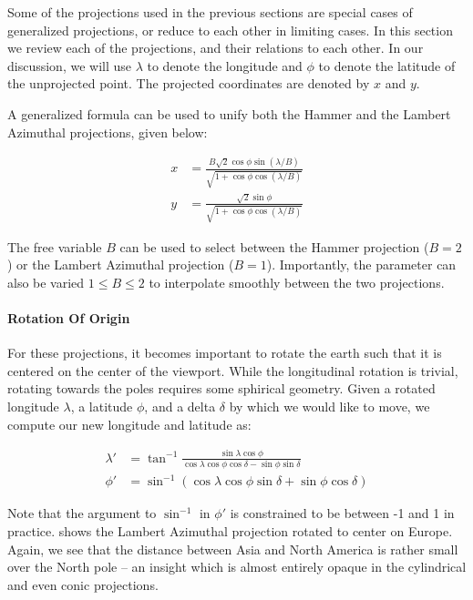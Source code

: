 Some of the projections used in the previous sections are special cases of
  generalized projections, or reduce to each other in limiting cases.
In this section we review each of the projections, and their relations to
  each other.
In our discussion, we will use $\lambda$ to denote the longitude and $\phi$
  to denote the latitude of the unprojected point.
The projected coordinates are denoted by $x$ and $y$.

A generalized formula can be used to unify both the Hammer and the Lambert
  Azimuthal projections, given below:

\def\nu{ \sqrt{1 + \cos \phi \cos (\lambda / B)} }
\begin{align}
x &= \frac{ B \sqrt{2} \cos \phi \sin (\lambda / B) } { \nu } \\
y &= \frac{ \sqrt{2} \sin \phi }{ \nu }
\end{align}

The free variable $B$ can be used to select between the Hammer projection
  ($B = 2$) or the Lambert Azimuthal projection ($B = 1$).
Importantly, the parameter can also be varied $1 \leq B \leq 2$ to interpolate
  smoothly between the two projections.

\paragraph{Rotation Of Origin}
For these projections, it becomes important to rotate the earth such that it is
  centered on the center of the viewport.
While the longitudinal rotation is trivial, rotating towards the poles requires
  some sphirical geometry.
Given a rotated longitude $\lambda$, a latitude $\phi$, and a delta $\delta$ by
  which we would like to move, we compute our new longitude and latitude as:

\def\cosdelta{ \cos \delta }
\def\sindelta{ \sin \delta }
\def\clat{ \cos \phi }
\def\x{ \cos \lambda \clat }
\def\y{ \sin \lambda \clat }
\def\z{ \sin \phi }
\def\k{ \x \sindelta + \z \cosdelta }
\begin{align}
\lambda' &= \tan^{-1} \frac{\y}{ \x \cosdelta - \z \sindelta } \\
\phi' &= \sin^{-1} (\k)
\end{align}

Note that the argument to $\sin^{-1}$ in $\phi'$ is constrained to be between
  -1 and 1 in practice.
 shows the Lambert Azimuthal projection rotated to center on
  Europe.
Again, we see that the distance between Asia and North America is rather small
  over the North pole -- an insight which is almost entirely opaque in the
  cylindrical and even conic projections.

